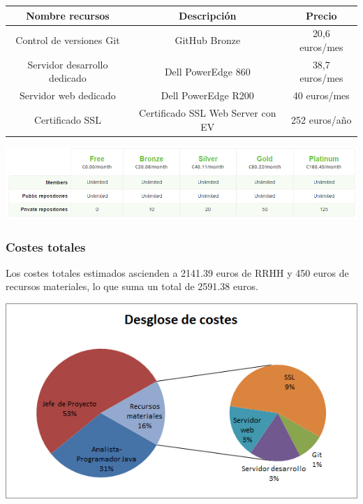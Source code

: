 \documentclass[12pt, a4paper, titlepage]{article}
\begin{document}
\begin{center}

\begin{tabular}{|c|c|c|}
\hline 
Nombre recursos & Descripción & Precio \\ 
\hline 
Control de versiones Git & GitHub Bronze & 20,6 euros/mes \\ 
\hline 
Servidor desarrollo dedicado & Dell PowerEdge 860 & 38,7 euros/mes \\ 
\hline 
Servidor web dedicado  & Dell PowerEdge R200 & 40 euros/mes \\ 
\hline 
Certificado SSL & Certificado SSL
Web Server
con EV & 252 euros/año \\ 
\hline 

\end{tabular}
\label{tab:coste_material}
\end{center}


\begin{center}
\includegraphics[scale=0.4]{imagenes/git_precios.png}
\label{fig:git_precios}
\end{center}

\subsubsection{Costes totales}

Los costes totales estimados ascienden a 2141.39 euros de RRHH y 450 euros de recursos materiales, lo que suma un total de 2591.38 euros.

\begin{center}

\includegraphics[scale=0.5]{Imagenes/costes_desglose.png}
\label{fig:cotes_desglose}
\end{center}
\end{document}
